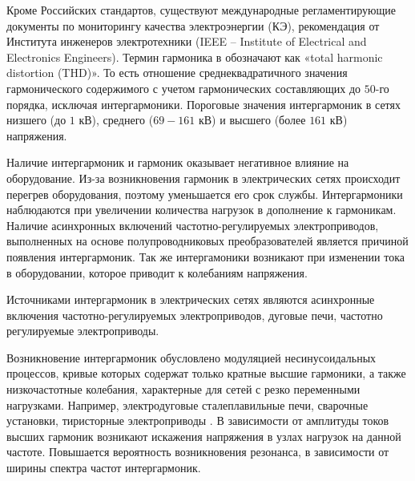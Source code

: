 Кроме Российских стандартов, существуют международные регламентирующие документы по мониторингу качества электроэнергии (КЭ), рекомендация от Института инженеров электротехники (IEEE – Institute of Electrical and Electronics Engineers). Термин гармоника в \cite{6826459} обозначают как «total harmonic distortion (THD)».
То есть отношение среднеквадратичного значения гармонического содержимого с учетом гармонических составляющих до $50$-го порядка, исключая интергармоники. Пороговые значения интергармоник в сетях низшего (до $1$ кВ), среднего ($69-161$ кВ) и высшего (более $161$ кВ) напряжения.

Наличие интергармоник и гармоник оказывает негативное влияние на оборудование. Из-за возникновения гармоник в электрических сетях происходит перегрев оборудования, поэтому уменьшается его срок службы. Интергармоники наблюдаются при увеличении количества нагрузок в дополнение к гармоникам. Наличие асинхронных включений частотно-регулируемых электроприводов, выполненных на основе полупроводниковых преобразователей является причиной появления интергармоник. Так же интергамоники возникают при изменении тока в оборудовании, которое приводит к колебаниям напряжения. 

Источниками интергармоник в электрических сетях являются асинхронные включения частотно-регулируемых электроприводов, дуговые печи, частотно регулируемые электроприводы. 

Возникновение интергармоник обусловлено модуляцией несинусоидальных процессов, кривые которых содержат только кратные высшие гармоники, а также низкочастотные колебания, характерные для сетей с резко переменными нагрузками. Например, электродуговые сталеплавильные печи, сварочные установки, тиристорные электроприводы \cite{Interharmonics_in_systems_Zhezhelenko_1999}. В зависимости от амплитуды токов высших гармоник возникают искажения напряжения в узлах нагрузок на данной частоте. Повышается вероятность возникновения резонанса, в зависимости от ширины спектра частот интергармоник. 

